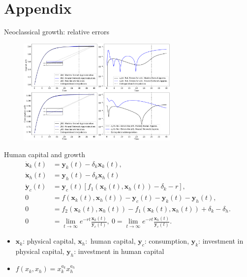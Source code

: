 \documentclass[aspectratio=169,10pt]{beamer}
\begin{document}
\section{Appendix}

\begin{frame}{Neoclassical growth: relative errors}
	\label{errors}
	\begin{figure}[t!]
		\centering
		\includegraphics[width=0.7\textwidth]{figs/neoclassical_growth_model_baseline.pdf}
		\vspace{-4mm}
	\end{figure}
			\hyperlink{ncg:results}{}
\end{frame}

\begin{frame}{Human capital and growth}
	\label{DAE}
\begin{align*}
	\dot{\mathbf{x}}_k(t) & = \mathbf{y}_{k}(t)-\delta_k \mathbf{x}_k(t),\\
	\dot{\mathbf{x}}_h(t) & = \mathbf{y}_{h}(t)-\delta_k \mathbf{x}_h(t)\\
	\dot{\mathbf{y}}_c(t) &= \mathbf{y}_c(t) \left[ f_1\left(\mathbf{x}_k(t),\mathbf{x}_h(t)\right) -\delta_k - r \right],\\
	0 & =   f\left(\mathbf{x}_k(t),\mathbf{x}_h(t)\right) - \mathbf{y}_c(t) -  \mathbf{y}_{k}(t) -  \mathbf{y}_{h}(t), \label{eq:human-capital-feasibility-condition}\\
	0 & = f_2\left(\mathbf{x}_k(t),\mathbf{x}_h(t)\right) - f_1\left(\mathbf{x}_k(t),\mathbf{x}_h(t)\right) + \delta_k-\delta_h.\\
		0 & = \lim_{t\rightarrow \infty} e^{-r t}\frac{\mathbf{x}_k(t)}{\mathbf{y}_c(t)}, ~
	0 = \lim_{t\rightarrow \infty} e^{-r t}\frac{\mathbf{x}_h(t)}{\mathbf{y}_c(t)}.
\end{align*}


\begin{itemize}
	\item $\mathbf{x}_k$: physical capital,  $\mathbf{x}_h:$ human capital, $\mathbf{y}_c$: consumption, $\mathbf{y}_k$: investment in physical capital, $\mathbf{y}_h$: investment in human capital 
	\vspace{0.1in}
	\item $f\left(x_k, x_h\right) = x_k^{a_k}x_h^{a_h}$
\end{itemize}
\hyperlink{butterfly}{}
\end{frame}
\end{document}
